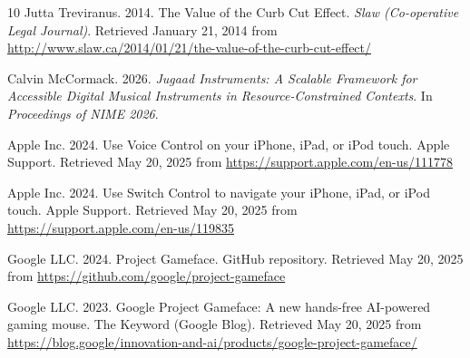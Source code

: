\documentclass[manuscript,screen,review,anonymous]{acmart}
\begin{document}
\begin{thebibliography}{10}
Jutta Treviranus. 2014.
The Value of the Curb Cut Effect.
\textit{Slaw (Co-operative Legal Journal)}.
Retrieved January 21, 2014 from \url{http://www.slaw.ca/2014/01/21/the-value-of-the-curb-cut-effect/}

Calvin McCormack. 2026.
\textit{Jugaad Instruments: A Scalable Framework for Accessible Digital Musical Instruments in Resource-Constrained Contexts}.
 In \textit{Proceedings of NIME 2026}.

Apple Inc. 2024.
Use Voice Control on your iPhone, iPad, or iPod touch.
Apple Support.
Retrieved May 20, 2025 from \url{https://support.apple.com/en-us/111778}

Apple Inc. 2024.
Use Switch Control to navigate your iPhone, iPad, or iPod touch.
Apple Support.
Retrieved May 20, 2025 from \url{https://support.apple.com/en-us/119835}

Google LLC. 2024.
Project Gameface.
GitHub repository.
Retrieved May 20, 2025 from \url{https://github.com/google/project-gameface}

Google LLC. 2023.
Google Project Gameface: A new hands-free AI-powered gaming mouse.
The Keyword (Google Blog).
Retrieved May 20, 2025 from \url{https://blog.google/innovation-and-ai/products/google-project-gameface/}


\end{thebibliography}
\end{document}
